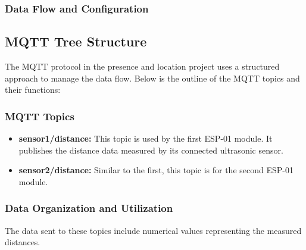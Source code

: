 \documentclass{article}
\begin{document}
\subsubsection{Data Flow and Configuration}

\subsection{MQTT Tree Structure}
The MQTT protocol in the presence and location project uses a structured approach to manage the data flow. Below is the outline of the MQTT topics and their functions:

\subsubsection{MQTT Topics}
\begin{itemize}
    \item \textbf{sensor1/distance:} This topic is used by the first ESP-01 module. It publishes the distance data measured by its connected ultrasonic sensor.
    \item \textbf{sensor2/distance:} Similar to the first, this topic is for the second ESP-01 module.
\end{itemize}

\subsubsection{Data Organization and Utilization}
The data sent to these topics include numerical values representing the measured distances. 
\end{document}
